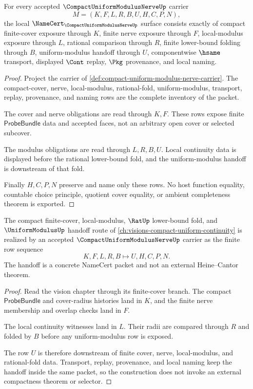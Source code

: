 \begin{theorem}
\label{thm:compact-uniform-modulus-nerve-namecert-obligations}
For every accepted $\CompactUniformModulusNerveUp$ carrier
$$
M=(K,F,L,R,B,U,H,C,P,N),
$$
the local $\NameCert_{\CompactUniformModulusNerveUp}$ surface consists exactly of compact finite-cover exposure through $K$, finite nerve exposure through $F$, local-modulus exposure through $L$, rational comparison through $R$, finite lower-bound folding through $B$, uniform-modulus handoff through $U$, componentwise $\hsame$ transport, displayed $\Cont$ replay, $\Pkg$ provenance, and local naming.
\end{theorem}
\begin{proof}
Project the carrier of \autoref{def:compact-uniform-modulus-nerve-carrier}. The compact-cover, nerve, local-modulus, rational-fold, uniform-modulus, transport, replay, provenance, and naming rows are the complete inventory of the packet.

The cover and nerve obligations are read through $K,F$. These rows expose finite $\mathsf{ProbeBundle}$ data and accepted faces, not an arbitrary open cover or selected subcover.

The modulus obligations are read through $L,R,B,U$. Local continuity data is displayed before the rational lower-bound fold, and the uniform-modulus handoff is downstream of that fold.

Finally $H,C,P,N$ preserve and name only these rows. No host function equality, countable choice principle, quotient cover equality, or ambient completeness theorem is exported.
\end{proof}

\begin{theorem}
\label{thm:compact-uniform-modulus-nerve-vision-handoff}
The compact finite-cover, local-modulus, $\RatUp$ lower-bound fold, and $\UniformModulusUp$ handoff route of \autoref{ch:visions-compact-uniform-continuity} is realized by an accepted $\CompactUniformModulusNerveUp$ carrier as the finite row sequence
$$
K,F,L,R,B \longmapsto U,H,C,P,N .
$$
The handoff is a concrete NameCert packet and not an external Heine--Cantor theorem.
\end{theorem}
\begin{proof}
Read the vision chapter through its finite-cover branch. The compact $\mathsf{ProbeBundle}$ and cover-radius histories land in $K$, and the finite nerve membership and overlap checks land in $F$.

The local continuity witnesses land in $L$. Their radii are compared through $R$ and folded by $B$ before any uniform-modulus row is exposed.

The row $U$ is therefore downstream of finite cover, nerve, local-modulus, and rational-fold data. Transport, replay, provenance, and local naming keep the handoff inside the same packet, so the construction does not invoke an external compactness theorem or selector.
\end{proof}

